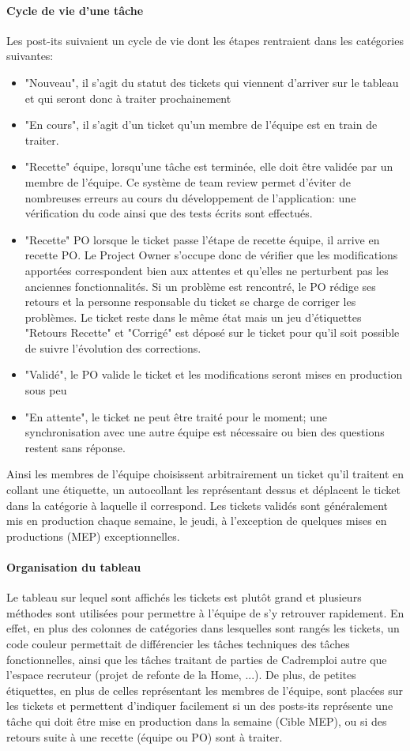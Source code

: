 \paragraph{Cycle de vie d'une tâche}
Les post-its suivaient un cycle de vie dont les étapes rentraient dans les catégories suivantes:
\begin{itemize}
  \item "Nouveau", il s'agit du statut des tickets qui viennent d'arriver sur le tableau et qui seront donc à traiter prochainement
  \item "En cours", il s'agit d'un ticket qu'un membre de l'équipe est en train de traiter.
  \item "Recette" équipe, lorsqu'une tâche est terminée, elle doit être validée par un membre de l'équipe.
  Ce système de team review permet d'éviter de nombreuses erreurs au cours du développement de l'application: une vérification du code ainsi que des tests écrits sont effectués.
  \item "Recette" PO lorsque le ticket passe l'étape de recette équipe, il arrive en recette PO.
  Le Project Owner s'occupe donc de vérifier que les modifications apportées correspondent bien aux attentes et qu'elles ne perturbent pas les anciennes fonctionnalités.
  Si un problème est rencontré, le PO rédige ses retours et la personne responsable du ticket se charge de corriger les problèmes.
  Le ticket reste dans le même état mais un jeu d'étiquettes "Retours Recette" et "Corrigé" est déposé sur le ticket pour qu'il soit possible de suivre l'évolution des corrections.
  \item "Validé", le PO valide le ticket et les modifications seront mises en production sous peu
  \item "En attente", le ticket ne peut être traité pour le moment; une synchronisation avec une autre équipe est nécessaire ou bien des questions restent sans réponse.
\end{itemize}
Ainsi les membres de l'équipe choisissent arbitrairement un ticket qu'il traitent en collant une étiquette, un autocollant les représentant dessus et déplacent le ticket dans la catégorie à laquelle il correspond.
Les tickets validés sont généralement mis en production chaque semaine, le jeudi, à l'exception de quelques mises en productions (MEP) exceptionnelles.
\paragraph{Organisation du tableau}
Le tableau sur lequel sont affichés les tickets est plutôt grand et plusieurs méthodes sont utilisées pour permettre à l'équipe de s'y retrouver rapidement.
En effet, en plus des colonnes de catégories dans lesquelles sont rangés les tickets, un code couleur permettait de différencier les tâches techniques des tâches fonctionnelles, ainsi que les tâches traitant de parties de Cadremploi autre que l'espace recruteur (projet de refonte de la Home, ...).
De plus, de petites étiquettes, en plus de celles représentant les membres de l'équipe, sont placées sur les tickets et permettent d'indiquer facilement si un des posts-its représente une tâche qui doit être mise en production dans la semaine (Cible MEP), ou si des retours suite à une recette (équipe ou PO) sont à traiter.
